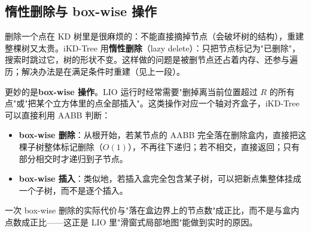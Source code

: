 \subsection{惰性删除与 box-wise 操作}

删除一个点在 KD 树里是很麻烦的：不能直接摘掉节点（会破坏树的结构），重建整棵树又太贵。iKD-Tree 用\textbf{惰性删除}（lazy delete）：只把节点标记为"已删除"，搜索时跳过它，树的形状不变。这样做的问题是被删节点还占着内存、还参与遍历；解决办法是在满足条件时重建（见上一段）。

更妙的是\textbf{box-wise 操作}。LIO 运行时经常需要"删掉离当前位置超过 $R$ 的所有点"或"把某个立方体里的点全部插入"。这类操作对应一个轴对齐盒子，iKD-Tree 可以直接利用 AABB 判断：
\begin{itemize}
  \item \textbf{box-wise 删除}：从根开始，若某节点的 AABB 完全落在删除盒内，直接把这棵子树整体标记删除（$O(1)$），不再往下递归；若不相交，直接返回；只有部分相交时才递归到子节点。
  \item \textbf{box-wise 插入}：类似地，若插入盒完全包含某子树，可以把新点集整体挂成一个子树，而不是逐个插入。
\end{itemize}
一次 box-wise 删除的实际代价与"落在盒边界上的节点数"成正比，而不是与盒内点数成正比——这正是 LIO 里"滑窗式局部地图"能做到实时的原因。

